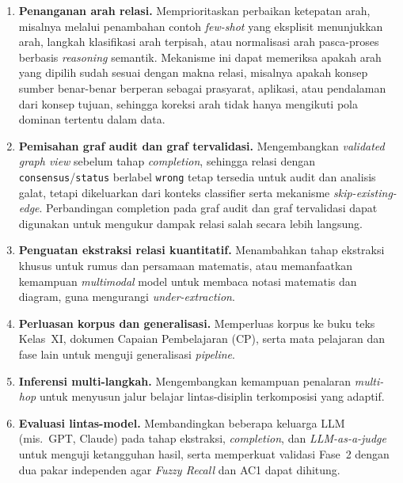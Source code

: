 \documentclass[../../thesis]{subfiles}
\begin{document}
\begin{enumerate}
  \item \textbf{Penanganan arah relasi.} Memprioritaskan perbaikan ketepatan arah,
        misalnya melalui penambahan contoh \textit{few-shot} yang eksplisit
        menunjukkan arah, langkah klasifikasi arah terpisah, atau normalisasi
        arah pasca-proses berbasis \textit{reasoning} semantik. Mekanisme ini
        dapat memeriksa apakah arah yang dipilih sudah sesuai dengan makna
        relasi, misalnya apakah konsep sumber benar-benar berperan sebagai
        prasyarat, aplikasi, atau pendalaman dari konsep tujuan, sehingga
        koreksi arah tidak hanya mengikuti pola dominan tertentu dalam data.

  \item \textbf{Pemisahan graf audit dan graf tervalidasi.} Mengembangkan
        \textit{validated graph view} sebelum tahap \textit{completion}, sehingga
        relasi dengan \texttt{consensus}/\texttt{status} berlabel
        \texttt{wrong} tetap tersedia untuk audit dan analisis galat, tetapi
        dikeluarkan dari konteks classifier serta mekanisme
        \textit{skip-existing-edge}. Perbandingan completion pada graf audit dan
        graf tervalidasi dapat digunakan untuk mengukur dampak relasi salah
        secara lebih langsung.

  \item \textbf{Penguatan ekstraksi relasi kuantitatif.} Menambahkan tahap
        ekstraksi khusus untuk rumus dan persamaan matematis, atau memanfaatkan
        kemampuan \textit{multimodal} model untuk membaca notasi matematis dan
        diagram, guna mengurangi \textit{under-extraction}.

  \item \textbf{Perluasan korpus dan generalisasi.} Memperluas korpus ke buku teks
        Kelas~XI, dokumen Capaian Pembelajaran (CP), serta mata pelajaran dan fase
        lain untuk menguji generalisasi \textit{pipeline}.

  \item \textbf{Inferensi multi-langkah.} Mengembangkan kemampuan penalaran
        \textit{multi-hop} untuk menyusun jalur belajar lintas-disiplin
        terkomposisi yang adaptif.

  \item \textbf{Evaluasi lintas-model.} Membandingkan beberapa keluarga LLM (mis.\
        GPT, Claude) pada tahap ekstraksi, \textit{completion}, dan
        \textit{LLM-as-a-judge} untuk menguji ketangguhan hasil, serta memperkuat
        validasi Fase~2 dengan dua pakar independen agar \textit{Fuzzy Recall} dan AC1
        dapat dihitung.
\end{enumerate}
\end{document}
